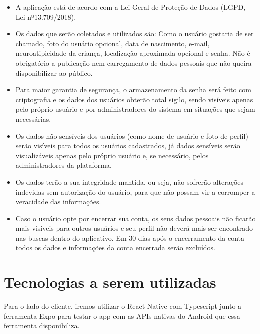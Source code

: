 \begin{itemize}
    \item A aplicação está de acordo com a Lei Geral de Proteção de Dados (LGPD, Lei nº13.709/2018). 
    
    \item Os dados que serão coletados e utilizados são: Como o usuário gostaria de ser chamado, foto do usuário opcional, data de nascimento, e-mail, neuroatipicidade da criança, localização aproximada opcional e senha. Não é obrigatório a publicação nem carregamento de dados pessoais que não queira disponibilizar ao público. 
    
    \item Para maior garantia de segurança, o armazenamento da senha será feito com criptografia e os dados dos usuários obterão total sigilo, sendo visíveis apenas pelo próprio usuário e por administradores do sistema em situações que sejam necessárias. 
    
    \item Os dados não sensíveis dos usuários (como nome de usuário e foto de perfil) serão visíveis para todos os usuários cadastrados, já dados sensíveis serão visualizáveis apenas pelo próprio usuário e, se necessário, pelos administradores da plataforma. 
    
    \item Os dados terão a sua integridade mantida, ou seja, não sofrerão alterações indevidas sem autorização do usuário, para que não possam vir a corromper a veracidade das informações. 
    
    \item Caso o usuário opte por encerrar sua conta, os seus dados pessoais não ficarão mais visíveis para outros usuários e seu perfil não deverá mais ser encontrado nas buscas dentro do aplicativo. Em 30 dias após o encerramento da conta todos os dados e informações da conta encerrada serão excluídos. 
\end{itemize}

\chapter{Tecnologias a serem utilizadas}

Para o lado do cliente, iremos utilizar o React Native com Typescript junto a ferramenta Expo para testar o app com as APIs nativas do Android que essa ferramenta disponibiliza.

